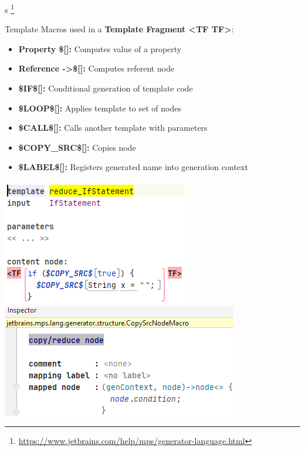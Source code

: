 	\begin{frame}{\workshoptemplate s \footnote[11]{\url{https://www.jetbrains.com/help/mps/generator-language.html}}}
		\begin{minipage}{0.52\textwidth}			
			Template Macros used in a \textbf{Template Fragment <TF TF>}:\\
			\begin{itemize}
				\item \textbf{Property \$[]:} Computes value of a property
				\item \textbf{Reference ->\$[]:} Computes referent node
				\item \textbf{\$IF\$[]:} Conditional generation of template code
				\item \textbf{\$LOOP\$[]:} Applies template to set of nodes
				\item \textbf{\$CALL\$[]:} Calls another template with parameters
				\item \textbf{\$COPY\_SRC\$[]:} Copies node
				\item \textbf{\$LABEL\$[]:} Registers generated name into generation context
			\end{itemize}
		\end{minipage}
		\begin{minipage}{0.4\textwidth}
			\includegraphics[height=0.5\textheight]{illustrations/template.png}
			\includegraphics[height=0.38\textheight]{illustrations/template_inspector.png}
		\end{minipage}
	\end{frame}

